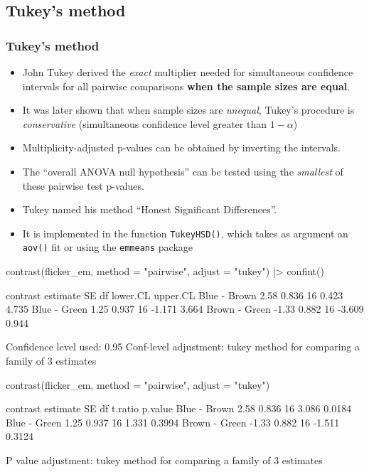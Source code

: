 \documentclass[a4paper]{article}
\begin{document}
\subsection{Tukey's method}
\subsubsection{Tukey's method}
\begin{itemize}
	\item John Tukey derived the \textit{exact} multiplier needed for simultaneous confidence intervals for all pairwise comparisons \textbf{when the sample sizes are equal}.
	\item It was later shown that when sample sizes are \textit{unequal}, Tukey's procedure is \textit{conservative} (simultaneous confidence level greater than \( 1-\alpha \))
	\item Multiplicity-adjusted p-values can be obtained by inverting the intervals.
	\item The ``overall ANOVA null hypothesis'' can be tested using the \textit{smallest} of these pairwise test p-values.
	\item Tukey named his method ``Honest Significant Differences''.
	\item It is implemented in the function \lstinline|TukeyHSD()|, which takes as argument an \lstinline|aov()| fit or using the \lstinline|emmeans| package
\end{itemize}
\begin{Schunk}
\begin{Sinput}
contrast(flicker_em, method = "pairwise", adjust = "tukey") |> confint()
\end{Sinput}
\begin{Soutput}
 contrast      estimate    SE df lower.CL upper.CL
 Blue - Brown      2.58 0.836 16    0.423    4.735
 Blue - Green      1.25 0.937 16   -1.171    3.664
 Brown - Green    -1.33 0.882 16   -3.609    0.944

Confidence level used: 0.95 
Conf-level adjustment: tukey method for comparing a family of 3 estimates 
\end{Soutput}
\begin{Sinput}
contrast(flicker_em, method = "pairwise", adjust = "tukey")
\end{Sinput}
\begin{Soutput}
 contrast      estimate    SE df t.ratio p.value
 Blue - Brown      2.58 0.836 16   3.086  0.0184
 Blue - Green      1.25 0.937 16   1.331  0.3994
 Brown - Green    -1.33 0.882 16  -1.511  0.3124

P value adjustment: tukey method for comparing a family of 3 estimates 
\end{Soutput}
\end{Schunk}
\end{document}
